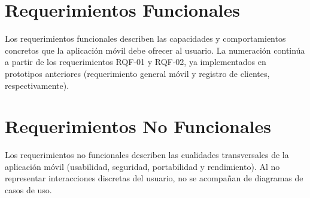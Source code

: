 \section{Requerimientos Funcionales}

Los requerimientos funcionales describen las capacidades y comportamientos concretos que la aplicación móvil debe ofrecer al usuario. La numeración continúa a partir de los requerimientos RQF-01 y RQF-02, ya implementados en prototipos anteriores (requerimiento general móvil y registro de clientes, respectivamente).





\clearpage
\section{Requerimientos No Funcionales}

Los requerimientos no funcionales describen las cualidades transversales de la aplicación móvil (usabilidad, seguridad, portabilidad y rendimiento). Al no representar interacciones discretas del usuario, no se acompañan de diagramas de casos de uso.






